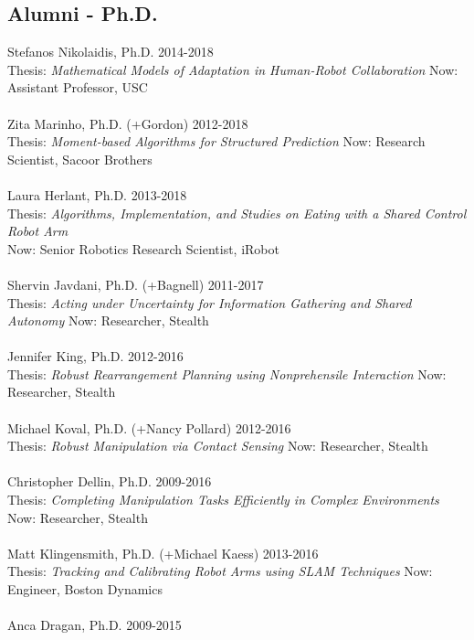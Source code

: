 \subsection{Alumni - Ph.D.}
\noindent
Stefanos Nikolaidis, Ph.D. \hfill 2014-2018\\
Thesis: \textit{Mathematical Models of Adaptation in Human-Robot Collaboration} \hfill
Now: Assistant Professor, USC\\
\\
Zita Marinho, Ph.D. (+Gordon) \hfill 2012-2018\\
Thesis: \textit{Moment-based Algorithms for Structured Prediction}\hfill
Now: Research Scientist, Sacoor Brothers\\
\\
Laura Herlant, Ph.D. \hfill 2013-2018\\
Thesis: \textit{Algorithms, Implementation, and Studies on Eating with a Shared Control Robot Arm}
\\
Now: Senior Robotics Research Scientist, iRobot\\
\\
Shervin Javdani, Ph.D. (+Bagnell) \hfill 2011-2017\\
Thesis: \textit{Acting under Uncertainty for Information Gathering and Shared Autonomy } \hfill Now: Researcher, Stealth\\
\\
Jennifer King, Ph.D. \hfill 2012-2016\\
Thesis: \textit{Robust Rearrangement Planning using Nonprehensile Interaction} \hfill Now: Researcher, Stealth\\
\\
Michael Koval, Ph.D. (+Nancy Pollard) \hfill 2012-2016\\
Thesis: \textit{Robust Manipulation via Contact Sensing} \hfill Now: Researcher, Stealth\\
\\
Christopher Dellin, Ph.D. \hfill 2009-2016\\
Thesis: \textit{Completing Manipulation Tasks Efficiently in Complex Environments} \hfill Now: Researcher, Stealth\\
\\
Matt Klingensmith, Ph.D. (+Michael Kaess) \hfill 2013-2016\\
Thesis: \textit{Tracking and Calibrating Robot Arms using SLAM Techniques} \hfill Now: Engineer, Boston Dynamics\\
\\
Anca Dragan, Ph.D. \hfill 2009-2015\\
